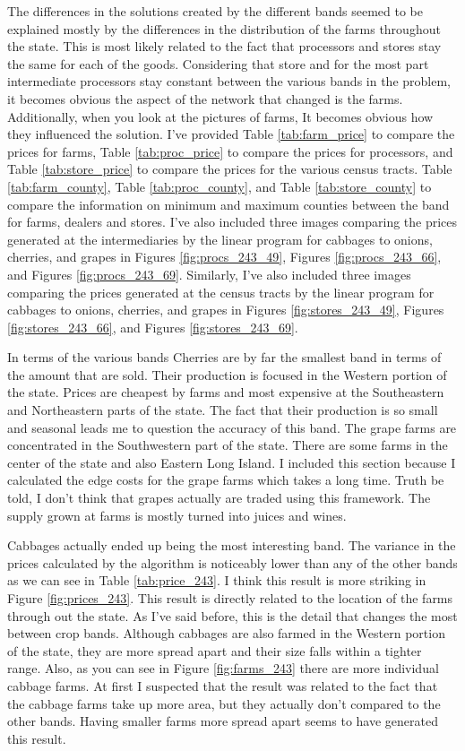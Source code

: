 \documentclass{report}
\begin{document}
The differences in the solutions created by the different bands seemed to be explained mostly by the differences in the distribution of the farms throughout the state. This is most likely related to the fact that processors and stores stay the same for each of the goods. Considering that store and for the most part intermediate processors stay constant between the various bands in the problem, it becomes obvious the aspect of the network that changed is the farms. Additionally, when you look at the pictures of farms, It becomes obvious how they influenced the solution. I've provided Table \ref{tab:farm_price} to compare the prices for farms, Table \ref{tab:proc_price} to compare the prices for processors, and Table \ref{tab:store_price} to compare the prices for the various census tracts. Table \ref{tab:farm_county}, Table \ref{tab:proc_county}, and Table \ref{tab:store_county} to compare the information on minimum and maximum counties between the band for farms, dealers and stores. I've also included three images comparing the prices generated at the intermediaries by the linear program for cabbages to onions, cherries, and grapes in Figures \ref{fig:procs_243_49}, Figures \ref{fig:procs_243_66}, and Figures \ref{fig:procs_243_69}. Similarly, I've also included three images comparing the prices generated at the census tracts by the linear program for cabbages to onions, cherries, and grapes in Figures \ref{fig:stores_243_49}, Figures \ref{fig:stores_243_66}, and Figures \ref{fig:stores_243_69}.

In terms of the various bands Cherries are by far the smallest band in terms of the amount that are sold. Their production is focused in the Western portion of the state. Prices are cheapest by farms and most expensive at the Southeastern and Northeastern parts of the state. The fact that their production is so small and seasonal leads me to question the accuracy of this band. The grape farms are concentrated in the Southwestern part of the state. There are some farms in the center of the state and also Eastern Long Island. I included this section because I calculated the edge costs for the grape farms which takes a long time. Truth be told, I don't think that grapes actually are traded using this framework. The supply grown at farms is mostly turned into juices and wines. 

Cabbages actually ended up being the most interesting band. The variance in the prices calculated by the algorithm is noticeably lower than any of the other bands as we can see in Table \ref{tab:price_243}. I think this result is more striking in Figure \ref{fig:prices_243}. This result is directly related to the location of the farms through out the state. As I've said before, this is the detail that changes the most between crop bands. Although cabbages are also farmed in the Western portion of the state, they are more spread apart and their size falls within a tighter range. Also, as you can see in Figure \ref{fig:farms_243} there are more individual cabbage farms. At first I suspected that the result was related to the fact that the cabbage farms take up more area, but they actually don't compared to the other bands. Having smaller farms more spread apart seems to have generated this result.
\end{document}
